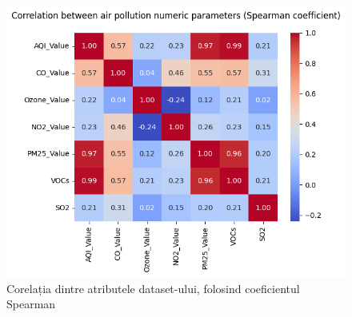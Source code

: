 \documentclass{article}
\begin{document}
\begin{figure}[ht]
    \centering
    \includegraphics[scale=0.6]{images/air_pollution/correlation/matrix_spearman.png}
    \caption{Corelația dintre atributele dataset-ului, folosind coeficientul Spearman}
    \label{fig:b}
\end{figure}
\end{document}
